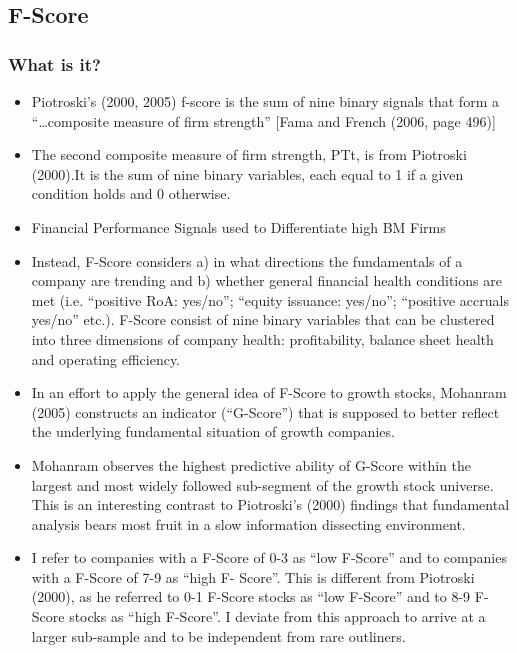 \documentclass[12pt]{article}
\begin{document}
\subsection{F-Score}

    \subsubsection{What is it?}

        \begin{itemize}

            \item Piotroski’s (2000, 2005) f-score is the sum of nine binary signals that form a “…composite measure of firm strength” [Fama and French (2006, page 496)] \citep{Choi2012}

            \item The second composite measure of firm strength, PTt, is from Piotroski (2000).It is the sum of nine binary variables, each equal to 1 if a given condition holds and 0 otherwise.\citep{Fama2006}

            \item Financial Performance Signals used to Differentiate high BM Firms \citep{Piotroski2000}

            \item Instead, F-Score considers a) in what directions the fundamentals of a company are trending and b) whether general financial health conditions are met (i.e. “positive RoA: yes/no”; “equity issuance: yes/no”; “positive accruals yes/no” etc.). F-Score consist of nine binary variables that can be clustered into three dimensions of company health: profitability, balance sheet health and operating efficiency.\citep{Mohr2012}
        
            \item In an effort to apply the general idea of F-Score to growth stocks, Mohanram (2005) constructs an indicator (“G-Score”) that is supposed to better reflect the underlying fundamental situation of growth companies. \citep{Mohr2012}

            \item Mohanram observes the highest predictive ability of G-Score within the largest and most widely followed sub-segment of the growth stock universe. This is an interesting contrast to Piotroski’s (2000) findings that fundamental analysis bears most fruit in a slow information dissecting environment. \citep{Mohr2012}

            \item I refer to companies with a F-Score of 0-3 as “low F-Score” and to companies with a F-Score of 7-9 as “high F- Score”. This is different from Piotroski (2000), as he referred to 0-1 F-Score stocks as “low F-Score” and to 8-9 F-Score stocks as “high F-Score”. I deviate from this approach to arrive at a larger sub-sample and to be independent from rare outliners. \citep{Mohr2012}
        \end{itemize}
\end{document}
